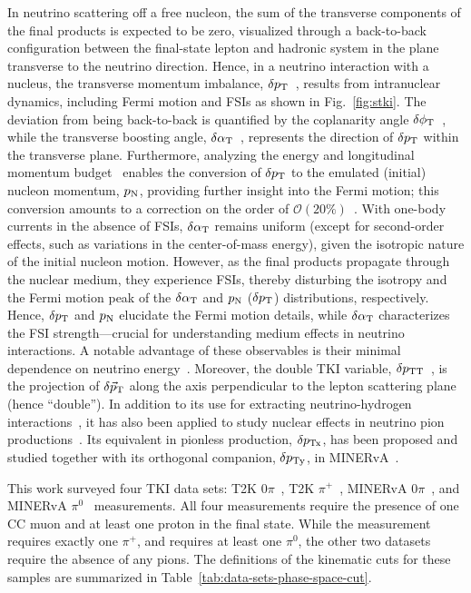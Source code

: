 In neutrino scattering off a free nucleon, the sum of the transverse components of the final products is expected to be zero, visualized through a back-to-back configuration between the final-state lepton and hadronic system in the  plane transverse to the neutrino direction. Hence, in a neutrino interaction with a nucleus, the transverse momentum imbalance, $\delta p_\textrm{T}$~\cite{Lu:2015tcr}, results from intranuclear dynamics, including Fermi motion and FSIs  as shown in Fig.~\ref{fig:stki}. The deviation from being back-to-back is quantified by the  coplanarity angle $\delta\phi_\textrm{T}$~\cite{Lu:2015tcr}, while the transverse boosting angle, $\delta\alpha_\textrm{T}$~\cite{Lu:2015tcr}, represents the direction of $\delta p_\textrm{T}$ within the transverse plane. Furthermore, analyzing the energy and longitudinal momentum budget~\cite{Furmanski:2016wqo, Lu:2019nmf} enables the conversion of $\delta p_\textrm{T}$ to the emulated (initial) nucleon momentum, $p_\textrm{N}$,  providing further insight into the Fermi motion; this conversion amounts to a correction on the order of $\mathcal{O}(20\%)$~\cite{Yang:2023dxk}. 
With one-body currents in the absence of FSIs, $\delta\alpha_\textrm{T}$ remains uniform (except for second-order effects, such as variations in the center-of-mass energy), given the isotropic nature of the initial nucleon motion. However, as the final products propagate through the nuclear medium, they experience FSIs, thereby disturbing the isotropy and the Fermi motion peak of the $\delta\alpha_\textrm{T}$ and $p_\textrm{N}$ ($\delta p_\textrm{T}$) distributions, respectively. Hence, $\delta p_\textrm{T}$ and $p_\textrm{N}$ elucidate the Fermi motion details, while $\delta\alpha_\textrm{T}$  characterizes the FSI strength---crucial for understanding medium effects in neutrino interactions. A notable advantage of these observables is their minimal dependence on neutrino energy~\cite{Lu:2015tcr}. Moreover, the double TKI variable, $\delta p_\textrm{TT}$~\cite{Lu:2015hea}, is the projection of $\delta \vec{p}_\textrm{T}$ along the axis perpendicular to the lepton scattering plane (hence ``double''). In addition to its use for extracting neutrino-hydrogen interactions~\cite{Lu:2015hea, Hamacher-Baumann:2020ogq}, it has also been applied to study nuclear effects in neutrino pion productions~\cite{MINERvA:2020anu, T2K:2021naz}. Its equivalent in pionless production, $\delta p_\textrm{Tx}$, has been proposed and studied together with its orthogonal companion, $\delta p_\textrm{Ty}$, in MINERvA~\cite{MINERvA:2019ope}. 

This work surveyed four TKI data sets: T2K $0\pi$~\cite{T2K:2018rnz}, T2K $\pi^+$~\cite{T2K:2021naz}, MINERvA $0\pi$~\cite{MINERvA:2018hba, MINERvA:2019ope}, and MINERvA $\pi^0$~\cite{MINERvA:2020anu} measurements. All four measurements require the presence of one CC muon and at least one proton in the final state. While the \ttkpip measurement requires exactly one $\pi^+$, and \minpiz requires at least one $\pi^0$, the other two datasets require the absence of any pions. The definitions of the kinematic cuts for these samples are summarized in Table~\ref{tab:data-sets-phase-space-cut}. 

